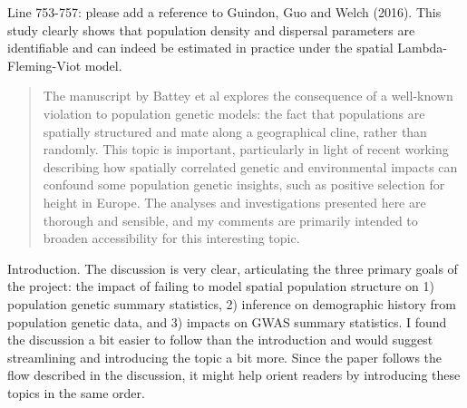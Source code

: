 
\begin{point}{}
    Line 753-757: please add a reference to Guindon, Guo and Welch (2016). This study clearly shows that population density and dispersal parameters are identifiable and can indeed be estimated in practice under the spatial Lambda-Fleming-Viot model.
\end{point}





\begin{quote}
    The manuscript by Battey et al explores the consequence of a well-known
    violation to population genetic models: the fact that populations are
    spatially structured and mate along a geographical cline, rather than
    randomly. This topic is important, particularly in light of recent working
    describing how spatially correlated genetic and environmental impacts can
    confound some population genetic insights, such as positive selection for
    height in Europe. The analyses and investigations presented here are
    thorough and sensible, and my comments are primarily intended to broaden
    accessibility for this interesting topic.
\end{quote}

\begin{point}{}
    Introduction. The discussion is very clear, articulating the three primary goals of the project: the impact of failing to model spatial population structure on 1) population genetic summary statistics, 2) inference on demographic history from population genetic data, and 3) impacts on GWAS summary statistics. I found the discussion a bit easier to follow than the introduction and would suggest streamlining and introducing the topic a bit more. Since the paper follows the flow described in the discussion, it might help orient readers by introducing these topics in the same order.
\end{point}

